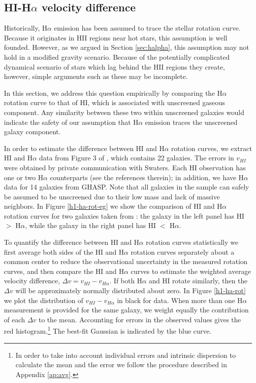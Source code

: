 \documentclass{emulateapj}
\newcommand{\ha}{H$\alpha$}
\begin{document}
\subsection{HI-\ha{} velocity difference}
\label{sec:hihalpha}

Historically, \ha{} emission has been assumed to trace the stellar rotation
curve.  Because it originates in HII regions near hot stars, this assumption
is well founded.  However, as we argued in Section \ref{sec:halpha}, this
assumption may not hold in a modified gravity scenario.  Because of the
potentially complicated dynamical scenario of stars which lag behind the HII
regions they create, however, simple arguments such as these may be incomplete.

In this section, we address this question empirically
by comparing the \ha{} rotation curve to that of HI, which is
associated with unscreened gaseous component. Any similarity between
these two within unscreened galaxies would indicate the safety of our
assumption that \ha{} emission traces the unscreened galaxy component.

In order to estimate the difference between HI and \ha{} rotation
curves, we extract HI and \ha{} data from Figure 3 of \citet{Swaters2009}, which
contains 22 galaxies. The errors in $v_{HI}$ were obtained by private
communication with Swaters.  Each HI observation has one or two \ha{}
counterparts (see the references therein); in addition, we have \ha{} data for
14 galaxies from GHASP. Note that all galaxies in the sample can safely be
assumed to be unscreened due
to their low mass and lack of massive neighbors. In Figure \ref{h1-ha-rot-eg} we
show the comparison of HI and \ha{} rotation curves for two galaxies taken from
\citet{Swaters2009}: the galaxy in the left panel has HI $>$ \ha{}, while the
galaxy in the right panel has HI $<$ \ha{}.


To quantify the difference between HI and \ha{} rotation curves statistically
we first average both sides of the HI and \ha{} rotation curves
separately about a common center to reduce the observational uncertainty in the
measured rotation curves, and then compare the HI and \ha{} curves to estimate
the weighted average velocity difference, $\Delta v = v_{HI} - v_{H\alpha}$.
If both \ha{} and HI rotate similarly, then the $\Delta v$ will
be approximately normally distributed about zero.
In Figure \ref{h1-ha-rot} we plot the distribution of $v_{HI}-v_{H\alpha}$ in
black for \citet{Swaters2009} data. When more than one
\ha{} measurement is provided for the same galaxy, we weight equally the
contribution of each  $\Delta v$ to the mean. Accounting for errors in the
observed values gives the red histogram.\footnote{
In order to take into account individual errors and
intrinsic dispersion to calculate the mean and the error we follow the
procedure described in Appendix \ref{ap:avg}.}  The best-fit Gaussian is
indicated by the blue curve.
\end{document}
